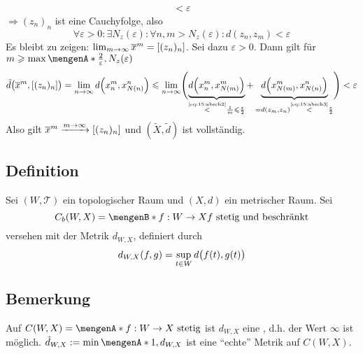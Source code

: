 \begin{description}
\begin{description}
\begin{align*}
		< \varepsilon
	\end{align*}
	$\Rightarrow (z_n)_n$ ist eine Cauchyfolge, also 
	\begin{equation*}
		\forall \varepsilon>0 : \exists N_z(\varepsilon) : \forall n,m > N_z(\varepsilon)  : d(z_n,z_m) < \varepsilon  \label{eq:15:absch3} \tag{\#}
	\end{equation*}
	Es bleibt zu zeigen: $\lim_{m \to \infty} \overline{x}^m = \benbrace*{(z_n)_n}$. Sei dazu $\varepsilon>0$. Dann gilt für 
	$m \ge \max \set{\frac{2}{\varepsilon}, N_z(\varepsilon)}$
	\begin{align*}
		\tilde{d} \enbrace[\big]{\overline{x}^m, \benbrace*{(z_n)_n}} = \lim_{ n \to \infty} d \enbrace*{x^m_n, x^n_{N(n)}}\le \lim_{ n \to \infty} 
		\enbrace[\Bigg]{ \underbrace{d\enbrace*{x_n^m, x^m_{N(m)}}}_{\stackrel{\mbox{\tiny\eqref{eq:15:absch2}}}{<} \frac{1}{m} \le \frac{\varepsilon}{2}  } +
		\underbrace{d\enbrace*{x^m_{N(m)}, x^n_{N(n)}}}_{=d(z_m,z_n) \stackrel{\mbox{\tiny\eqref{eq:15:absch3}}}{<} \frac{\varepsilon}{2} } } < \varepsilon
	\end{align*}
	Also gilt $\overline{x}^m \xrightarrow{m \to \infty} \benbrace*{(z_n)_n}$ und $(\tilde{X},\tilde{d})$ ist vollständig. \bewende
	\end{description}
\end{description}

\subsection[Definition: Raum der beschränkten, stetigen Abbildungen]{Definition} %
\label{sub:16}
Sei $(W,\mathcal{T})$ ein topologischer Raum und $(X,d)$ ein metrischer Raum. Sei 
\[
	C_b(W,X) = \set[f : W \to X]{f \text{ stetig und beschränkt}} 
\]
versehen mit der Metrik $d_{W,X}$, definiert durch
\[
	d_{W,X}(f,g) = \sup_{t \in W} d \enbrace[\big]{f(t), g(t)} 
\]

\subsection[Bemerkung: $d_{W,X}$ als Metrik auf $C(W,X)$]{Bemerkung} %
\label{sub:17}
Auf $C(W,X) = \set{f : W \to X \text{ stetig}} $ ist $d_{W,X}$ eine , d.h. der Wert $\infty$ ist möglich.
$\tilde{d}_{W,X} := \min \set{1, d_{W,X}} $ ist eine \enquote{echte} Metrik auf $C(W,X)$.

